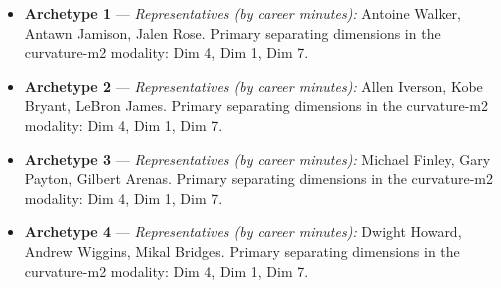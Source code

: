 \begin{itemize}
\item \textbf{Archetype 1} --- \emph{Representatives (by career minutes):} Antoine Walker, Antawn Jamison, Jalen Rose. Primary separating dimensions in the curvature-m2 modality: Dim 4, Dim 1, Dim 7.
\item \textbf{Archetype 2} --- \emph{Representatives (by career minutes):} Allen Iverson, Kobe Bryant, LeBron James. Primary separating dimensions in the curvature-m2 modality: Dim 4, Dim 1, Dim 7.
\item \textbf{Archetype 3} --- \emph{Representatives (by career minutes):} Michael Finley, Gary Payton, Gilbert Arenas. Primary separating dimensions in the curvature-m2 modality: Dim 4, Dim 1, Dim 7.
\item \textbf{Archetype 4} --- \emph{Representatives (by career minutes):} Dwight Howard, Andrew Wiggins, Mikal Bridges. Primary separating dimensions in the curvature-m2 modality: Dim 4, Dim 1, Dim 7.
\end{itemize}
